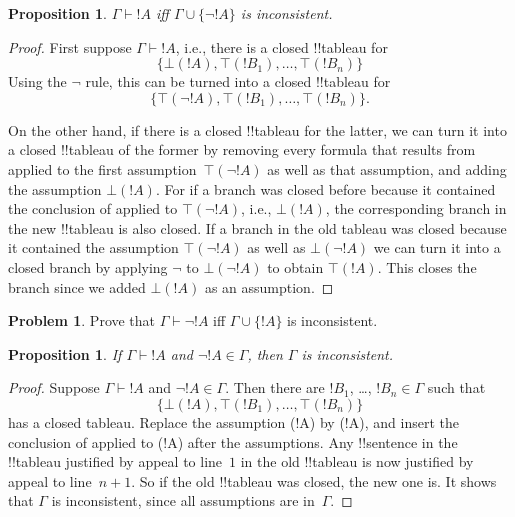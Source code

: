 \documentclass[10pt,a4paper]{article}
\theoremstyle{plain}
\newtheorem{prop}[thm]{Proposition}
\theoremstyle{definition}
\newtheorem{prob}{Problem}[section]
\theoremstyle{remark}
\newcommand*{\ollabel}[1]{\label{#1}}
\providecommand{\Proves}{\mathrel{\vdash}}
\providecommand{\sFmla}[2]{#1(#2)}
\providecommand{\True}{\top}
\providecommand{\False}{\bot}
\providecommand{\TRule}[1]{}
\begin{document}
\begin{prop}
\ollabel{prop:prov-incons}
$\Gamma \Proves !A$ iff $\Gamma \cup \{\lnot !A\}$ is inconsistent.
\end{prop}

\begin{proof}
First suppose $\Gamma \Proves !A$, i.e., there is
a closed !!{tableau} for
\[
\{\sFmla{\False}{!A},
\sFmla{\True}{!B_1}, \dots, \sFmla{\True}{!B_n}\}
\]
Using the $\TRule{\True}{\lnot}$ rule, this can be turned into a
closed !!{tableau} for
\[
\{\sFmla{\True}{\lnot !A},
\sFmla{\True}{!B_1}, \dots, \sFmla{\True}{!B_n}\}.
\]

On the other hand, if there is a closed !!{tableau} for the latter, we
can turn it into a closed !!{tableau} of the former by removing every
formula that results from \TRule{\True}{\lnot} applied to the first
assumption~$\sFmla{\True}{\lnot !A}$ as well as that assumption, and
adding the assumption $\sFmla{\False}{!A}$. For if a branch was closed
before because it contained the conclusion of \TRule{\True}{\lnot}
applied to $\sFmla{\True}{\lnot !A}$, i.e., $\sFmla{\False}{!A}$, the
corresponding branch in the new !!{tableau} is also closed. If a
branch in the old tableau was closed because it contained the
assumption $\sFmla{\True}{\lnot !A}$ as well as $\sFmla{\False}{\lnot
  !A}$ we can turn it into a closed branch by applying
$\TRule{\False}{\lnot}$ to $\sFmla{\False}{\lnot !A}$ to obtain
$\sFmla{\True}{!A}$. This closes the branch since we added
$\sFmla{\False}{!A}$ as an assumption.
\end{proof}

\begin{prob}
Prove that $\Gamma \Proves \lnot !A$ iff $\Gamma \cup \{!A\}$ is inconsistent.
\end{prob}

\begin{prop}\ollabel{prop:explicit-inc}
  If $\Gamma \Proves !A$ and $\lnot !A \in \Gamma$, then $\Gamma$ is
  inconsistent.
\end{prop}

\begin{proof}
  Suppose $\Gamma \Proves !A$ and $\lnot !A \in \Gamma$.  Then there
  are $!B_1$, \dots, $!B_n \in \Gamma$ such that \
  \[
  \{\sFmla{\False}{!A}, \sFmla{\True}{!B_1}, \dots, \sFmla{\True}{!B_n}\}
  \]
  has a closed tableau. Replace the assumption \sFmla{\False}{!A} by
  \sFmla{\True}{\lnot !A}, and insert the conclusion of
  \TRule{\True}{\lnot} applied to \sFmla{\False}{!A} after the
  assumptions. Any !!{sentence} in the !!{tableau} justified by appeal
  to line~$1$ in the old !!{tableau} is now justified by appeal to
  line~$n+1$. So if the old !!{tableau} was closed, the new one is.
  It shows that $\Gamma$ is inconsistent, since all assumptions are
  in~$\Gamma$.
\end{proof}
\end{document}
